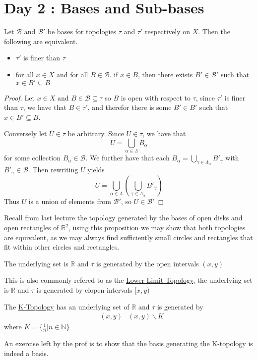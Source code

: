\section{Day 2 : Bases and Sub-bases}
\begin{proposition}
    Let $\mathscr{B}$ and $\mathscr{B}'$ be bases for topologies $\tau$ and $\tau'$ respectively on $X$. Then the following are equivalent.
    \begin{itemize}
        \item $\tau'$ is finer than $\tau$
        \item for all $x\in X$ and for all $B\in\mathscr{B}$. if $x\in B$, then there exists $B'\in\mathscr{B}'$ such that $x\in B'\subseteq B$
    \end{itemize}
\end{proposition}
\begin{proof}
    Let $x\in X$ and $B\in\mathscr{B}\subseteq\tau$ so $B$ is open with respect to $\tau$, since $\tau'$ is finer than $\tau$, we have that $B\in\tau'$, and therefor there is some $B'\in B'$ such that $x\in B'\subseteq B$. 

Conversely let $U\in\tau$ be arbitrary. Since $U\in\tau$, we have that 
\[U=\bigcup_{\alpha\in\Lambda}B_\alpha\]
for some collection $B_\alpha\in\mathscr{B}$. We further have that each $B_\alpha=\bigcup_{\gamma\in\Lambda_\alpha}B'_\gamma$ with $B'_\gamma\in\mathscr{B}$. Then rewriting $U$ yields
\[U=\bigcup_{\alpha\in\Lambda}\left(\bigcup_{\gamma\in\Lambda_\alpha}B'_\gamma\right)\]
Thus $U$ is a union of elements from $\mathscr{B}'$, so $U\in\mathscr{B}'$
\end{proof}
Recall from last lecture the topology generated by the bases of open disks and open rectangles of $\mathbb{R}^2$, using this proposition we may show that both topologies are equivalent, as we may always find sufficiently small circles and rectangles that fit within other circles and rectangles.

\begin{example}
    The underlying set is $\mathbb{R}$ and $\tau$ is generated by the open intervals $(x,y)$
\end{example}
\begin{example}
    This is also commonly refered to as the \href{https://en.wikipedia.org/wiki/Lower_limit_topology}{Lower Limit Topology}, the underlying set is $\mathbb{R}$ and $\tau$ is generated by clopen intervals $[x,y)$
\end{example}
\begin{example}[K-Topology]
    The \href{https://en.wikipedia.org/wiki/K-topology}{K-Topology} has an underlying set of $\mathbb{R}$ and $\tau$ is generated by
    \begin{align*}
        &(x,y) &(x,y)\backslash K
    \end{align*}
    where $K=\{\frac{1}{n}\vert n\in\mathbb{N}\}$
\end{example}
An exercise left by the prof is to show that the basis generating the K-topology is indeed a basis.

